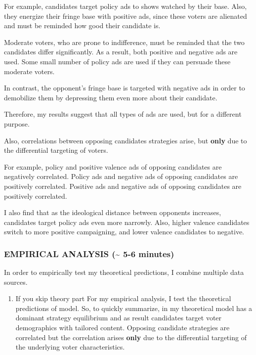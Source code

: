 \documentclass[12pt]{article}
\theoremstyle{plain}
\theoremstyle{plain}
\theoremstyle{plain}
\theoremstyle{plain}
\theoremstyle{plain}
\theoremstyle{plain}
\begin{document}
\begin{itemize}
For example, candidates target policy ads to shows watched by their base.
Also, they energize their fringe base with positive ads,
since these voters are alienated and must be reminded how good their candidate is.

Moderate voters, who are prone to indifference, must be reminded that the two candidates differ significantly.
As a result, both positive and negative ads are used.
Some small number of policy ads are used if they can persuade these moderate voters.

In contrast, the opponent's fringe base is targeted with negative ads in order to demobilize them by depressing them even more about their candidate.

Therefore, my results suggest that all types of ads are used, but for a different purpose.

Also, correlations between opposing candidates strategies arise, but \textbf{only} due to the differential targeting of voters.

For example, policy and positive valence ads of opposing candidates are negatively correlated.
Policy ads and negative ads of opposing candidates are positively correlated.
Positive ads and negative ads of opposing candidates are positively correlated.

I also find that as the ideological distance between opponents increases, candidates target policy ads even more narrowly.
Also, higher valence candidates switch to more positive campaigning, and lower valence candidates to negative.
\end{itemize}



\subsubsection{EMPIRICAL ANALYSIS (\textasciitilde{} 5-6 minutes)}
\label{sec:org7253236}

In order to empirically test my theoretical predictions, I combine multiple data sources.

\begin{enumerate}
\item If you skip theory part
\label{sec:org05ecdfe}
For my empirical analysis, I test the theoretical predictions of model.
So, to quickly summarize, in my theoretical model has a dominant strategy equilibrium
and as result candidates target voter demographics with tailored content.
Opposing candidate strategies are correlated but the correlation arises \textbf{only}
due to the differential targeting of the underlying voter characteristics.
\end{enumerate}
\end{document}
